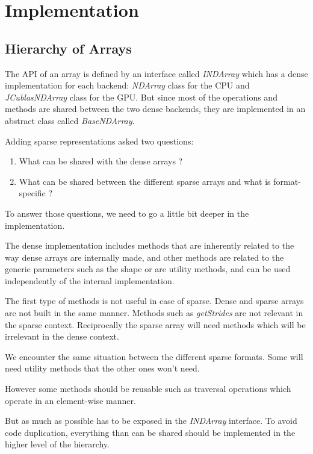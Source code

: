 \chapter{Implementation}


\section{Hierarchy of Arrays}

The API of an array is defined by an interface called \textit{INDArray} which has a dense implementation for each backend: \textit{NDArray} class for the CPU and \textit{JCublasNDArray} class for the GPU. But since most of the operations and methods are shared between the two dense backends, they are implemented in an abstract class called \textit{BaseNDArray}.

Adding sparse representations asked two questions:
\begin{enumerate}
 	\item What can be shared with the dense arrays ?
	\item What can be shared between the different sparse arrays and what is format-specific ?
\end{enumerate}

To answer those questions, we need to go a little bit deeper in the implementation. 

The dense implementation includes methods that are inherently related to the way dense arrays are internally made, and other methods are related to the generic parameters such as the shape or are utility methods, and can be used independently of the internal implementation.

The first type of methods is not useful in case of sparse. Dense and sparse arrays are not built in the same manner. Methods such as \textit{getStrides} are not relevant in the sparse context. Reciprocally the sparse array will need methods which will be irrelevant in the dense context.

We encounter the same situation between the different sparse formats. Some will need utility methods that the other ones won't need.

However some methods should be reusable such as traversal operations which operate in an element-wise manner.

But as much as possible has to be exposed in the \textit{INDArray} interface. To avoid code duplication, everything than can be shared should be implemented in the higher level of the hierarchy. 

